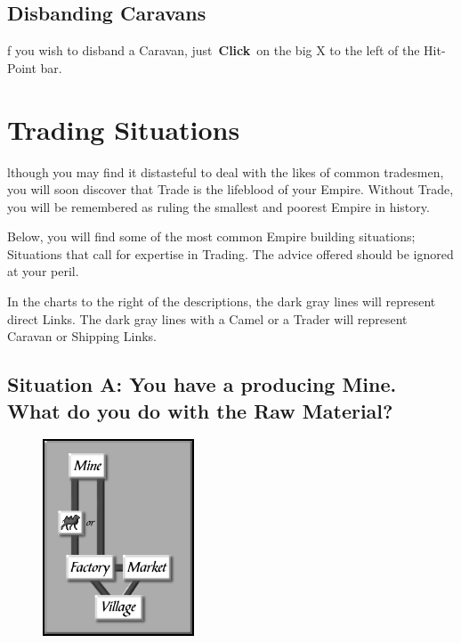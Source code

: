 \subsection{Disbanding Caravans}


f you wish to disband a Caravan, just \textbf{Click} on the big X to the left of the Hit-Point bar.

\section{Trading Situations}


lthough you may find it distasteful to deal with the likes of common tradesmen, you will soon discover that Trade is the lifeblood of your Empire. Without Trade, you will be remembered as ruling the smallest and poorest Empire in history.

Below, you will find some of the most common Empire building situations; Situations that call for expertise in Trading. The advice offered should be ignored at your peril.

In the charts to the right of the descriptions, the dark gray lines will represent direct Links. The dark gray lines with a Camel or a Trader will represent Caravan or Shipping Links.

\subsection{Situation A: You have a producing Mine. What do you do with the Raw Material?}

\begin{figure}
	\vspace{-20pt}
	\begin{center}
		\includegraphics[width=0.4\textwidth]{Itradesit1}
	\end{center}
	\vspace{-20pt}
\end{figure}


